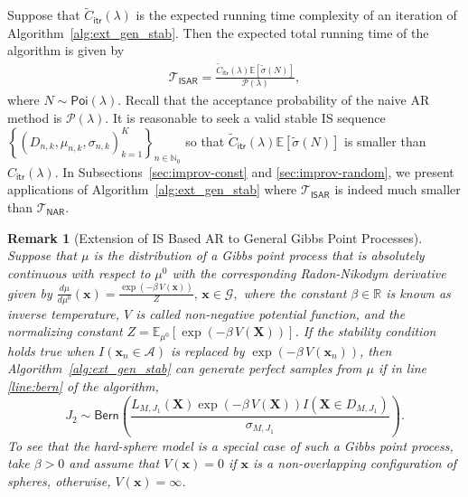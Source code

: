 \documentclass[11pt]{article}
\newcommand{\ee}{\mathbb{E}}
\newcommand{\reals}{\mathbb{R}}
\newcommand{\mbb}{\mathbb}
\newcommand{\lt}{\left}
\newcommand{\rt}{\right}
\newcommand{\wt}{\widetilde}
\newcommand{\pois}{\mathsf{Poi}}
\newcommand{\bern}{\mathsf{Bern}}
\newcommand{\pno}{\mathcal{P}(\lambda)}
\newcommand{\lfs}{\mathbf{x}}
\newcommand{\state}{\mathbf{X}}
\newcommand{\comAR}{\mathcal{T}_{\mathsf{NAR}}}
\newtheorem{remark}{Remark}
\begin{document}
Suppose that $\wt C_{\mathsf{itr}}(\lambda)$  is the  expected running time complexity of an iteration of Algorithm~\ref{alg:ext_gen_stab}. Then the expected total running time of the algorithm is given by
\begin{align}
\label{eqn:ISAR_cost}
{\mathcal{T}}_{\mathsf{ISAR}} = \frac{\wt C_{\mathsf{itr}}(\lambda)\ee[\wt \sigma(N)]}{\pno},
\end{align}
where ${N \sim \pois(\lambda)}$.
Recall that the acceptance probability of the naive AR method is $\pno$.
It is reasonable to seek a valid stable IS sequence  ${\lt\{ \lt(D_{n,k}, \mu_{n,k}, \sigma_{n,k}\rt)_{k = 1}^K\rt\}_{n \in \mbb{N}_0}}$
so that ${\wt C_{\mathsf{itr}}(\lambda)\ee[\wt \sigma(N)]}$ is smaller than ${C_{\mathsf{itr}}(\lambda)}$.
In Subsections~\ref{sec:improv-const} and \ref{sec:improv-random}, we present applications of Algorithm~\ref{alg:ext_gen_stab} where $\mathcal{T}_{\mathsf{ISAR}}$ is indeed much smaller than $\comAR$.

\begin{remark}[Extension of IS Based AR to General Gibbs Point Processes]
Suppose that $\mu$ is the distribution of a Gibbs point process that is absolutely continuous with respect to $\mu^0$ with the corresponding Radon-Nikodym derivative given by
$ {\frac{d\mu}{d\mu^0} \lt(\lfs \rt) = \frac{\exp\lt( - \beta\, V(\lfs)\rt)}{Z},\, \lfs \in \mathscr{G}},$ where the constant $\beta \in \reals$ is known as inverse temperature,
$V$ is called non-negative potential function, and the normalizing constant
${Z  = \ee_{\mu^0} \lt[\exp\lt( - \beta\, V(\state)\rt) \rt]}$. If the stability condition holds true when $I(\lfs _n\in \mathscr{A})$ is replaced by $\exp\lt( - \beta\, V(\lfs_n)\rt)$, then Algorithm~\ref{alg:ext_gen_stab} can  generate perfect samples from $\mu$ if in line \ref{line:bern} of the algorithm, 
\[
J_2 \sim \bern\lt(\frac{L_{M, J_1}(\state) \exp\lt( - \beta\, V(\state)\rt)I\lt(\state \in D_{M,J_1} \rt)}{\sigma_{M,J_1}}\rt).
\]
To see that the hard-sphere model is a special case of such a Gibbs point process, take  $\beta > 0$ and assume that ${V(\lfs) = 0}$ if $\lfs$ is a non-overlapping configuration of spheres, otherwise, ${V(\lfs)  = \infty}$.
\end{remark} 
\end{document}
